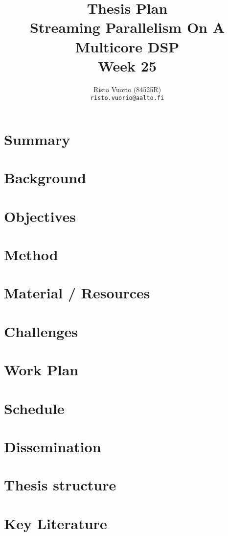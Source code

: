 \documentclass[a4paper,10pt]{article}
\title{Thesis Plan \\
		Streaming Parallelism On A Multicore DSP \\
		Week 25}
\author{Risto Vuorio (84525R) \\
		{\tt risto.vuorio@aalto.fi}}
\begin{document}
\maketitle
\newpage
\tableofcontents
\newpage

\section{Summary}


\section{Background}


\section{Objectives}


\section{Method}


\section{Material / Resources}


\section{Challenges}


\section{Work Plan}


\section{Schedule}


\section{Dissemination}


\pagebreak
\begin{appendices}
  \section{Thesis structure}
  

  \section{Key Literature}
  
\end{appendices}
\end{document}
